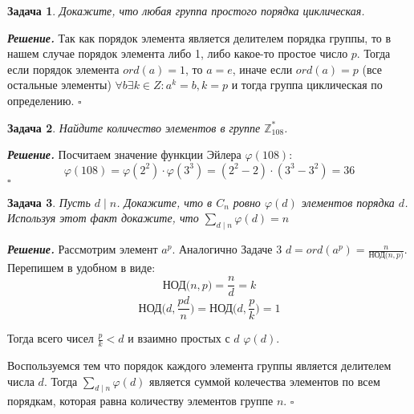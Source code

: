 \documentclass[12pt]{article}
\newtheorem{problem}{Задача}
\newenvironment{solution}[1][\it{Решение}]{\textbf{#1. } }{$\square$}
\begin{document}
 \begin{problem}
 Докажите, что любая группа простого порядка циклическая.
 \end{problem}

\begin{solution}
    Так как порядок элемента является делителем порядка группы, то в нашем случае порядок элемента либо 1, либо какое-то простое число $p$. Тогда если порядок элемента $ord(a) = 1$, то $a = e$, иначе если $ord(a) = p$ (все остальные элементы) $\forall b \exists k \in Z : a^k = b, k = p$ и тогда группа циклическая по определению. 
\end{solution}
 \begin{problem}
     Найдите количество элементов в группе $\mathbb{Z}_{108}^*$.
 \end{problem}

\begin{solution}
    Посчитаем значение функции Эйлера $\varphi(108)$:
    $$
    \varphi(108) = \varphi(2^2) \cdot \varphi(3^3) = (2^2 - 2) \cdot (3^3 - 3^2) = 36
    $$
\end{solution}
\begin{problem}
    Пусть $d \mid n$. Докажите, что в $C_n$ ровно $\varphi(d)$ элементов порядка $d$. Используя этот факт докажите, что $\sum_{d \mid n} \varphi(d)=n$
\end{problem}

\begin{solution}
    Рассмотрим элемент $a^p$. Аналогично Задаче 3 $d = ord(a^p) = \frac{n}{\text{НОД($n, p$)}}$. Перепишем в удобном в виде:
    $$
    \text{НОД($n, p$)}=\frac{n}{d}=k
    $$
    $$
    \text{НОД($d, \frac{pd}{n}$)}=  \text{НОД($d, \frac{p}{k}$)} = 1
    $$

    Тогда всего чисел $\frac{p}{k} < d$ и взаимно простых с $d$ $\varphi(d)$.

    Воспользуемся тем что порядок каждого элемента группы является делителем числа $d$. Тогда $\sum_{d \mid n} \varphi(d)$ является суммой колечества элементов по всем порядкам, которая равна количеству элементов группе $n$.
\end{solution}
\end{document}
